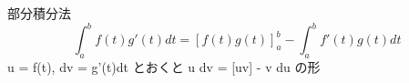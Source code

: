 \begin{frame}{部分積分法}
  \[
    \int_a^b f(t)g'(t) dt = [f(t)g(t)]_a^b - \int_a^b f'(t)g(t) dt
  \]
  {\small u = f(t), dv = g'(t)dt とおくと \int u dv = [uv] - \int v du の形}
\end{frame}


